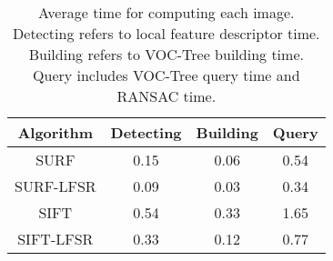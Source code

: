 \begin{table}
\begin{center}
\begin{tabular}{|c|c|c|c|}
\hline
Algorithm & Detecting & Building & Query \\
\hline\hline
SURF & 0.15 & 0.06 & 0.54 \\
SURF-LFSR & 0.09 & 0.03 & 0.34 \\
\hline\hline
SIFT & 0.54 & 0.33 & 1.65 \\
SIFT-LFSR & 0.33 & 0.12 & 0.77 \\
\hline
\end{tabular}
\end{center}
\caption{Average time for computing each image. Detecting refers to local feature descriptor time. Building refers to VOC-Tree building time. Query includes VOC-Tree query time and RANSAC time.}
\label{tab:integration}
\end{table}